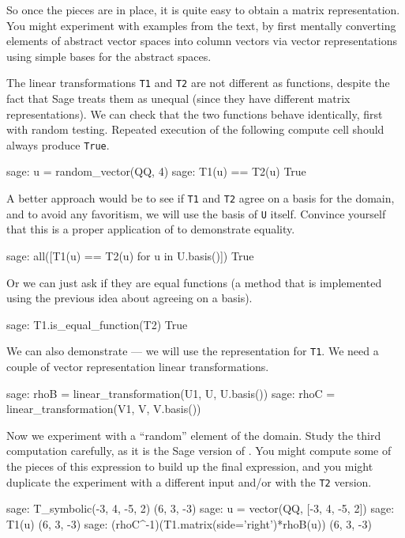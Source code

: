 %
So once the pieces are in place, it is quite easy to obtain a matrix representation.  You might experiment with examples from the text, by first mentally converting elements of abstract vector spaces into column vectors via vector representations using simple bases for the abstract spaces.\par
%
The linear transformations \verb?T1? and \verb?T2? are not different as functions, despite the fact that Sage treats them as unequal (since they have different matrix representations).  We can check that the two functions behave identically, first with random testing.  Repeated execution of the following compute cell should always produce \verb?True?.
%
\begin{sageexample}
sage: u = random_vector(QQ, 4)
sage: T1(u) == T2(u)
True
\end{sageexample}
%
A better approach would be to see if  \verb?T1? and \verb?T2? agree on a basis for the domain, and to avoid any favoritism, we will use the basis of \verb?U? itself.  Convince yourself that this is a proper application of  to demonstrate equality.
%
\begin{sageexample}
sage: all([T1(u) == T2(u) for u in U.basis()])
True
\end{sageexample}
%
Or we can just ask if they are equal functions (a method that is implemented using the previous idea about agreeing on a basis).
%
\begin{sageexample}
sage: T1.is_equal_function(T2)
True
\end{sageexample}
%
We can also demonstrate  --- we will use the representation for \verb?T1?.  We need a couple of vector representation linear transformations.
%
\begin{sageexample}
sage: rhoB = linear_transformation(U1, U, U.basis())
sage: rhoC = linear_transformation(V1, V, V.basis())
\end{sageexample}
%
Now we experiment with a ``random'' element of the domain.  Study the third computation carefully, as it is the Sage version of .  You might compute some of the pieces of this expression to build up the final expression, and you might duplicate the experiment with a different input and/or with the \verb?T2? version.
%
\begin{sageexample}
sage: T_symbolic(-3, 4, -5, 2)
(6, 3, -3)
sage: u = vector(QQ, [-3, 4, -5, 2])
sage: T1(u)
(6, 3, -3)
sage: (rhoC^-1)(T1.matrix(side='right')*rhoB(u))
(6, 3, -3)
\end{sageexample}
